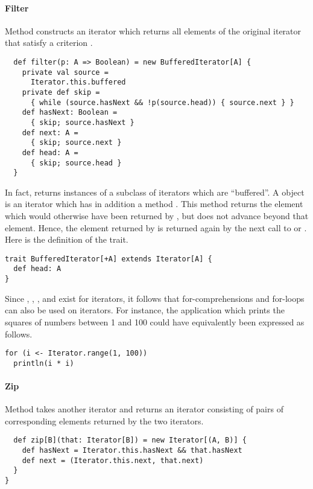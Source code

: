 {\paragraph{Filter} Method  constructs an iterator which
returns all elements of the original iterator that satisfy a criterion
.
\begin{lstlisting}
  def filter(p: A => Boolean) = new BufferedIterator[A] {
    private val source =
      Iterator.this.buffered
    private def skip =
      { while (source.hasNext && !p(source.head)) { source.next } }
    def hasNext: Boolean =
      { skip; source.hasNext }
    def next: A =
      { skip; source.next }
    def head: A =
      { skip; source.head }
  }
\end{lstlisting}
In fact,  returns instances of a subclass of iterators
which are ``buffered''.  A  object is an
iterator which has in addition a method . This method
returns the element which would otherwise have been returned by
, but does not advance beyond that element. Hence, the
element returned by  is returned again by the next call to
 or . Here is the definition of the
 trait.
\begin{lstlisting}
trait BufferedIterator[+A] extends Iterator[A] {
  def head: A
}
\end{lstlisting}
Since , , , and 
exist for iterators, it follows that for-comprehensions and for-loops
can also be used on iterators. For instance, the application which prints the squares of numbers between 1 and 100 could have equivalently been expressed as follows.
\begin{lstlisting}
for (i <- Iterator.range(1, 100))
  println(i * i)
\end{lstlisting}

\paragraph{Zip} Method  takes another iterator and
returns an iterator consisting of pairs of corresponding elements
returned by the two iterators.
\begin{lstlisting}
  def zip[B](that: Iterator[B]) = new Iterator[(A, B)] {
    def hasNext = Iterator.this.hasNext && that.hasNext
    def next = (Iterator.this.next, that.next)
  }
}
\end{lstlisting}

}
